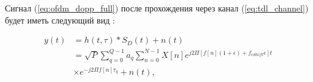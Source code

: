 




Сигнал (\ref{eq:ofdm_dopp_full}) после прохождения через канал (\ref{eq:tdl_channel})
будет иметь следующий вид :

\begin{equation}
    \label{eq:rx_signal_td}
    \begin{split}
    y(t) &= h(t, \tau) * S_D(t) + n(t) \\
         &= \sqrt{P} \sum_{q = 0}^{Q - 1} a_q \sum_{n = 0}^{N - 1} X[n] e^{j2 \Pi [f[n](1 + \epsilon) + f_{cShift}\epsilon] t} \\
         &\times e^{-j2 \Pi f[n]\tau_q} + n(t),
    \end{split}
\end{equation}

